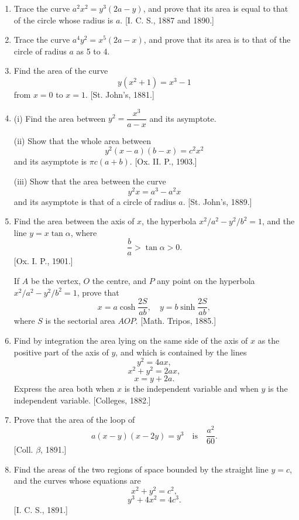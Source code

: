 \documentclass[11pt, a4paper]{article}
\newcommand{\source}[1]{\hfill\textnormal{[#1]}}
\begin{document}
\begin{enumerate}[leftmargin=2em]
(ii) Find the whole area of the curve
\[
a^2y^2=a^2x^2-x^4.
\]
\source{I. C. S., 1881.}

\item Trace the curve $a^2x^2=y^3(2a-y)$, and prove that its area is equal to that of the circle whose radius is $a$. \source{I. C. S., 1887 and 1890.}

\item Trace the curve $a^4y^2=x^5(2a-x)$, and prove that its area is to that of the circle of radius $a$ as 5 to 4.

\item Find the area of the curve
\[
y(x^2+1)=x^3-1
\]
from $x=0$ to $x=1$. \source{St. John's, 1881.}

\item (i) Find the area between $y^2=\dfrac{x^3}{a-x}$ and its asymptote.

(ii) Show that the whole area between
\[
y^2(x-a)(b-x)=c^2x^2
\]
and its asymptote is $\pi c(a+b)$. \source{Ox. II. P., 1903.}

(iii) Show that the area between the curve
\[
y^2x=a^3-a^2x
\]
and its asymptote is that of a circle of radius $a$. \source{St. John's, 1889.}

\item Find the area between the axis of $x$, the hyperbola $x^2/a^2-y^2/b^2=1$, and the line $y=x\tan\alpha$, where
\[
\frac{b}{a}>\tan\alpha>0.
\]
\source{Ox. I. P., 1901.}

If $A$ be the vertex, $O$ the centre, and $P$ any point on the hyperbola $x^2/a^2-y^2/b^2=1$, prove that
\[
x=a\cosh\frac{2S}{ab},\quad y=b\sinh\frac{2S}{ab},
\]
where $S$ is the sectorial area $AOP$. \source{Math. Tripos, 1885.}

\item Find by integration the area lying on the same side of the axis of $x$ as the positive part of the axis of $y$, and which is contained by the lines
\[
y^2=4ax,
\]
\[
x^2+y^2=2ax,
\]
\[
x=y+2a.
\]
Express the area both when $x$ is the independent variable and when $y$ is the independent variable. \source{Colleges, 1882.}

\item Prove that the area of the loop of
\[
a(x-y)(x-2y)=y^3\quad\text{is}\quad\frac{a^2}{60}.
\]
\source{Coll. $\beta$, 1891.}

\item Find the areas of the two regions of space bounded by the straight line $y=c$, and the curves whose equations are
\[
x^2+y^2=c^2,
\]
\[
y^3+4x^2=4c^3.
\]
\source{I. C. S., 1891.}


\end{enumerate}
\end{document}
